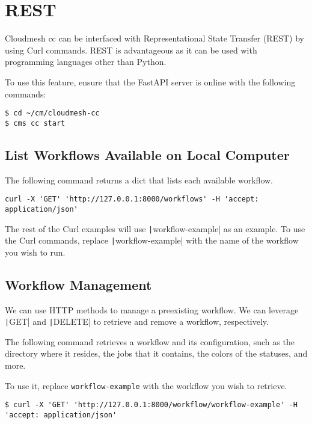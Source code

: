 
\section{REST}\label{rest}

Cloudmesh cc can be interfaced with Representational State Transfer
(REST) by using Curl commands. REST is advantageous as it can be used
with programming languages other than Python.

To use this feature, ensure that the FastAPI server is online with the
following commands:

\begin{verbatim}
$ cd ~/cm/cloudmesh-cc
$ cms cc start
\end{verbatim}

\subsection{List Workflows Available on Local
Computer}\label{list-workflows-available-on-local-computer}

The following command returns a dict that lists each available workflow.

\begin{verbatim}
curl -X 'GET' 'http://127.0.0.1:8000/workflows' -H 'accept: application/json'
\end{verbatim}

The rest of the Curl examples will use \texttt|workflow-example| as
an example. To use the Curl commands, replace \texttt|workflow-example| 
with the name of the workflow you wish to run.

\subsection{Workflow Management}\label{retrieve-a-workflow}

We can use HTTP methods to manage a preexisting workflow. We can leverage
\texttt|GET| and \texttt|DELETE| to retrieve and
remove a workflow, respectively.

The following command retrieves a workflow and its configuration, such
as the directory where it resides, the jobs that it contains, the colors
of the statuses, and more.

To use it, replace \texttt{workflow-example} with the workflow you wish
to retrieve.

\begin{verbatim}
$ curl -X 'GET' 'http://127.0.0.1:8000/workflow/workflow-example' -H 'accept: application/json'
\end{verbatim}

